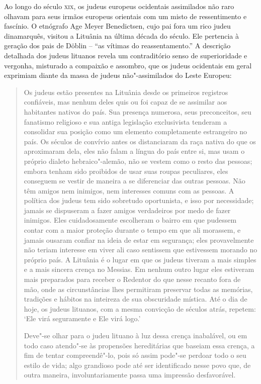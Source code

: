 Ao longo do século \textsc{xix}, os judeus europeus ocidentais assimilados não
raro olhavam para seus irmãos europeus orientais com um misto de
ressentimento e fascínio. O etnógrafo Age Meyer Benedictsen, cujo pai
fora um rico judeu dinamarquês, visitou a Lituânia na última década do
século. Ele pertencia à geração dos pais de Döblin -- ``as vítimas do
reassentamento.'' A descrição detalhada dos judeus lituanos revela um
contraditório senso de superioridade e vergonha, misturado a compaixão e
assombro, que os judeus ocidentais em geral exprimiam diante da massa de
judeus não"-assimilados do Leste Europeu:

\begin{quote}
Os judeus estão presentes na Lituânia desde os primeiros registros
confiáveis, mas nenhum deles quis ou foi capaz de se assimilar aos
habitantes nativos do país. Sua presença numerosa, seus preconceitos,
seu fanatismo religioso e sua antiga legislação exclusivista tenderam a
consolidar sua posição como um elemento completamente estrangeiro no
país. Os séculos de convívio antes os distanciaram da raça nativa do que
os aproximaram dela, eles não falam a língua do país entre si, mas usam
o próprio dialeto hebraico"-alemão, não se vestem como o resto das
pessoas; embora tenham sido proibidos de usar suas roupas peculiares,
eles conseguem se vestir de maneira a se diferenciar das outras pessoas.
Não têm amigos nem inimigos, nem interesses comuns com as pessoas. A
política dos judeus tem sido sobretudo oportunista, e isso por
necessidade; jamais se dispuseram a fazer amigos verdadeiros por medo de
fazer inimigos. Eles cuidadosamente escolheram o bairro em que pudessem
contar com a maior proteção durante o tempo em que ali morassem, e
jamais ousaram confiar na ideia de estar em segurança; eles
provavelmente não teriam interesse em viver ali caso sentissem que
estivessem morando no próprio país. A Lituânia é o lugar em que os
judeus tiveram a mais simples e a mais sincera crença no Messias. Em
nenhum outro lugar eles estiveram mais preparados para receber o
Redentor do que nesse recanto fora de mão, onde as circunstâncias lhes
permitiram preservar todas as memórias, tradições e hábitos na inteireza
de sua obscuridade mística. Até o dia de hoje, os judeus lituanos, com a
mesma convicção de séculos atrás, repetem: `Ele virá seguramente e Ele
virá logo.'

Deve"-se olhar para o judeu lituano à luz dessa crença inabalável, ou em
todo caso atendo"-se às propensões hereditárias que baseiam essa crença,
a fim de tentar compreendê"-lo, pois só assim pode"-se perdoar todo o seu
estilo de vida; algo grandioso pode até ser identificado nesse povo que,
de outra maneira, involuntariamente passa uma impressão desfavorável.


\end{quote}
